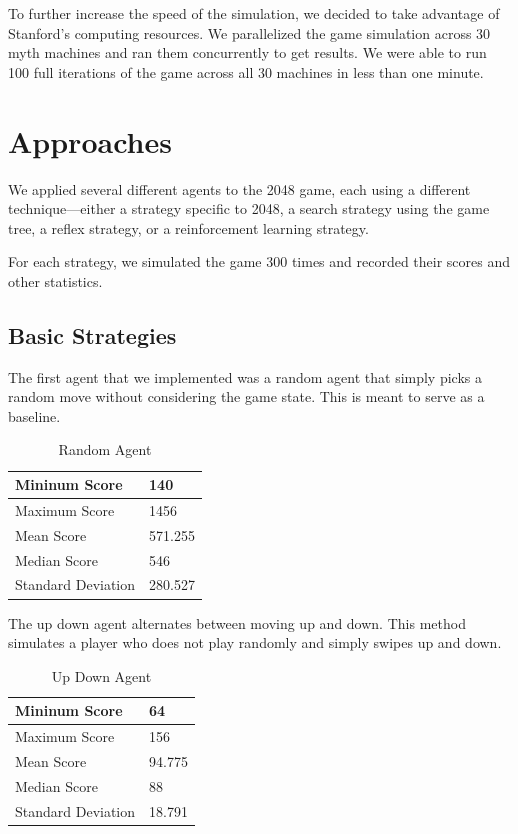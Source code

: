 \documentclass[9pt,twocolumn]{article}
\begin{document}
To further increase the speed of the simulation, we decided to take advantage of Stanford's computing resources. We parallelized the game simulation across 30 myth machines and ran them concurrently to get results. We were able to run 100 full iterations of the game across all 30 machines in less than one minute.

\section{Approaches}

We applied several different agents to the 2048 game, each using a different technique---either a strategy specific to 2048, a search strategy using the game tree, a reflex strategy, or a reinforcement learning strategy.

For each strategy, we simulated the game 300 times and recorded their scores and other statistics.

\subsection{Basic Strategies}

The first agent that we implemented was a random agent that simply picks a random move without considering the game state. This is meant to serve as a baseline.

\begin{table}[!htbp]

\centering

\begin{tabular}{|l|l|}
\hline
Mininum Score      & 140 \\ \hline
Maximum Score      & 1456 \\ \hline
Mean Score         & 571.255 \\ \hline
Median Score       & 546 \\ \hline
Standard Deviation & 280.527 \\ \hline
\end{tabular}

\caption{Random Agent}

\end{table}

The up down agent alternates between moving up and down. This method simulates a player who does not play randomly and simply swipes up and down.

\begin{table}[!htbp]

\centering

\begin{tabular}{|l|l|}
\hline
Mininum Score      & 64 \\ \hline
Maximum Score      & 156 \\ \hline
Mean Score         & 94.775 \\ \hline
Median Score       & 88 \\ \hline
Standard Deviation & 18.791 \\ \hline
\end{tabular}

\caption{Up Down Agent}

\end{table}
\end{document}
